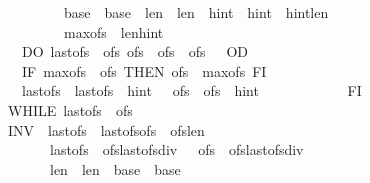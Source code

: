 \begin{isabellebody}
\ \ \ \ \ \ \ \ \ \ \ \ \ \ \ \ \ \ \ \ {\isasymacute}base\ {\isacharequal}\ \isactrlbsup {\isasymsigma}\isactrlesup base\ {\isasymand}\ {\isasymacute}len\ {\isacharequal}\ \isactrlbsup {\isasymsigma}\isactrlesup len\ {\isasymand}\ {\isasymacute}hint\ {\isacharequal}\ \isactrlbsup {\isasymsigma}\isactrlesup hint\ {\isasymand}\ {\isasymacute}hint{\isacharless}{\isasymacute}len\ {\isasymand}\isanewline
\ \ \ \ \ \ \ \ \ \ \ \ \ \ \ \ \ \ \ \ {\isasymacute}max{\isacharunderscore}ofs\ {\isacharequal}\ {\isasymacute}len{\isacharminus}{\isasymacute}hint\ {\isasymrbrace}\ \isanewline
\ \ \ \ \ \ \ \ \ \ \ \ \ \ DO\ {\isasymacute}last{\isacharunderscore}ofs\ {\isacharcolon}{\isacharequal}{\isacharequal}\ {\isasymacute}ofs{\isacharsemicolon}{\isacharsemicolon}\ {\isasymacute}ofs\ {\isacharcolon}{\isacharequal}{\isacharequal}\ {\isasymacute}ofs\ {\isacharplus}\ {\isasymacute}ofs\ {\isacharplus}\ {}\ OD{\isacharsemicolon}{\isacharsemicolon}\isanewline
\ \ \ \ \ \ \ \ \ \ \ \ \ \ IF\ {\isasymacute}max{\isacharunderscore}ofs\ {\isacharless}\ {\isasymacute}ofs\ THEN\ {\isasymacute}ofs\ {\isacharcolon}{\isacharequal}{\isacharequal}\ {\isasymacute}max{\isacharunderscore}ofs\ FI{\isacharsemicolon}{\isacharsemicolon}\isanewline
\ \ \ \ \ \ \ \ \ \ \ \ \ \ {\isasymacute}last{\isacharunderscore}ofs\ {\isacharcolon}{\isacharequal}{\isacharequal}\ {\isasymacute}last{\isacharunderscore}ofs\ {\isacharplus}\ {\isasymacute}hint\ {\isacharplus}\ {}{\isacharsemicolon}{\isacharsemicolon}\ {\isasymacute}ofs\ {\isacharcolon}{\isacharequal}{\isacharequal}\ {\isasymacute}ofs\ {\isacharplus}\ {\isasymacute}hint\isanewline
\ \ \ \ \ \ \ \ \ \ \ \ FI{\isacharsemicolon}{\isacharsemicolon}\isanewline
\ \ \ \ \ \ \ \ \ \ \ \ WHILE\ {\isasymacute}last{\isacharunderscore}ofs\ {\isacharless}\ {\isasymacute}ofs\ \isanewline
\ \ \ \ \ \ \ \ \ \ \ \ INV\ {\isasymlbrace}\ {\isasymacute}last{\isacharunderscore}ofs{\isasymge}{}\ {\isasymand}\ {\isasymacute}last{\isacharunderscore}ofs{\isasymle}{\isasymacute}ofs\ {\isasymand}\ {\isasymacute}ofs{\isasymle}{\isasymacute}len\ {\isasymand}\isanewline
\ \ \ \ \ \ \ \ \ \ \ \ \ \ \ \ \ \ {\isasymacute}last{\isacharunderscore}ofs\ {\isasymle}\ {\isacharparenleft}{\isasymacute}ofs{\isacharplus}{\isasymacute}last{\isacharunderscore}ofs{\isacharparenright}div\ {}\ {\isasymand}\ {\isasymacute}ofs\ {\isasymge}\ {\isacharparenleft}{\isasymacute}ofs{\isacharplus}{\isasymacute}last{\isacharunderscore}ofs{\isacharparenright}div\ {}\ {\isasymand}\isanewline
\ \ \ \ \ \ \ \ \ \ \ \ \ \ \ \ \ \ {\isasymacute}len\ {\isacharequal}\ \isactrlbsup {\isasymsigma}\isactrlesup len\ {\isasymand}\ {\isasymacute}base\ {\isacharequal}\ \isactrlbsup {\isasymsigma}\isactrlesup base\ {\isasymrbrace}\isanewline

\end{isabellebody}

